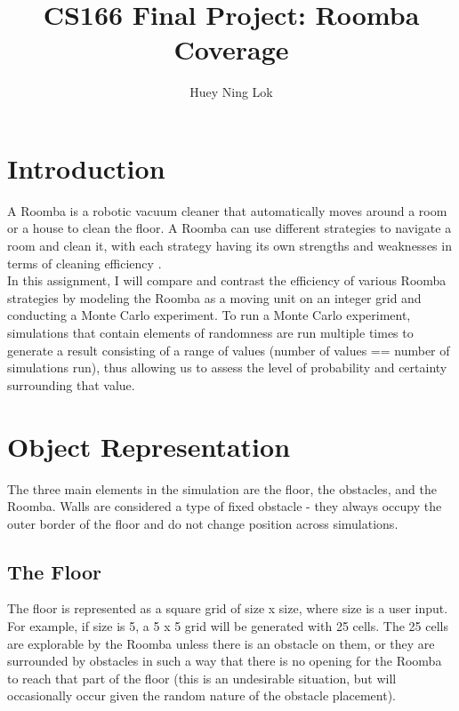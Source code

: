 \documentclass[11pt]{article}
\title{CS166 Final Project: Roomba Coverage}
\author{Huey Ning Lok}
\begin{document}
    
    
    \maketitle
    
   
\section{Introduction}

A Roomba is a robotic vacuum cleaner that automatically moves around a
room or a house to clean the floor. A Roomba can use different
strategies to navigate a room and clean it, with each strategy having
its own strengths and weaknesses in terms of cleaning efficiency
\cite{woodford}.\\

In this assignment, I will compare and contrast the efficiency of
various Roomba strategies by modeling the Roomba as a moving unit on an
integer grid and conducting a Monte Carlo experiment. To run a Monte
Carlo experiment, simulations that contain elements of randomness are
run multiple times to generate a result consisting of a range of values
(number of values == number of simulations run), thus allowing us to
assess the level of probability and certainty surrounding that value.

\section{Object Representation}

The three main elements in the simulation are the floor, the obstacles,
and the Roomba. Walls are considered a type of fixed obstacle - they
always occupy the outer border of the floor and do not change position
across simulations.

\subsection{The Floor}

The floor is represented as a square grid of size x size, where size is
a user input. For example, if size is 5, a 5 x 5 grid will be generated
with 25 cells. The 25 cells are explorable by the Roomba unless there is
an obstacle on them, or they are surrounded by obstacles in such a way
that there is no opening for the Roomba to reach that part of the floor
(this is an undesirable situation, but will occasionally occur given
the random nature of the obstacle placement).\\
\end{document}

